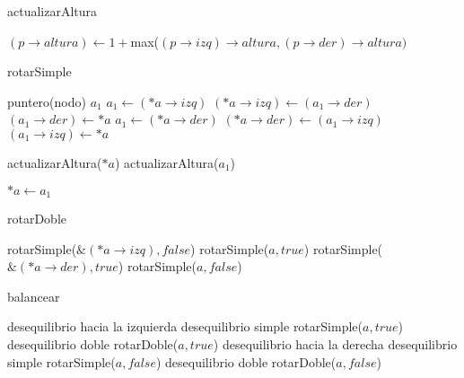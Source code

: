 \begin{Algoritmos}

\begin{algorithm}
\caption{actualizarAltura}
\begin{algorithmic}[1]
    \State $(p\to altura)\gets 1 + $max($(p\to izq)\to altura, (p\to der)\to altura)$
  \EndIf
\EndProcedure
\end{algorithmic}
\end{algorithm}

\begin{algorithm}
\caption{rotarSimple}
\begin{algorithmic}[1]
	\State puntero(nodo) $a_1$
    \State $a_1 \gets (*a\to izq)$
    \State $(*a\to izq) \gets (a_1\to der)$
    \State $(a_1\to der)\gets *a$
  \Else
    \State $a_1 \gets (*a\to der)$
    \State $(*a\to der) \gets (a_1\to izq)$
    \State $(a_1\to izq)\gets *a$
  \EndIf

  \State actualizarAltura($*a$)
  \State actualizarAltura($a_1$)
  
  \State $*a \gets a_1$
\EndProcedure
\end{algorithmic}
\end{algorithm}

\begin{algorithm}
\caption{rotarDoble}
\begin{algorithmic}[1]
    \State rotarSimple($\&(*a\to izq), false$)
    \State rotarSimple($a, true$)
  \Else
		\State rotarSimple($\&(*a\to der), true$)
    \State rotarSimple($a, false$)
  \EndIf
\EndProcedure
\end{algorithmic}
\end{algorithm}

\begin{algorithm}
\caption{balancear}
\begin{algorithmic}[1]
 				\Comment desequilibrio hacia la izquierda
 		   		\Comment desequilibrio simple
 		   		\State rotarSimple($a, true$)
 		   	\Else \Comment desequilibrio doble
 		   		\State rotarDoble($a, true$)
 		   	\EndIf			
			\EndIf	
			\Else
				\Comment desequilibrio hacia la derecha
 		   		\Comment desequilibrio simple
 		   		\State rotarSimple($a, false$)
 		   	\Else \Comment desequilibrio doble
 		   		\State rotarDoble($a, false$)
 		   	\EndIf
			\EndIf
		\EndIf
  \EndIf
\EndProcedure
\end{algorithmic}
\end{algorithm}


\end{Algoritmos}
